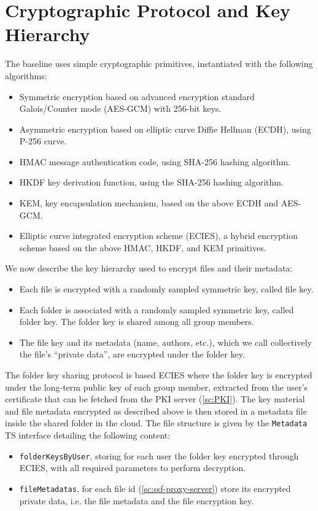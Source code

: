\section{Cryptographic Protocol and Key Hierarchy}\label{sc:baseline-protocol-hierarcy}

The baseline uses simple cryptographic primitives, instantiated with the following algorithms:
\begin{itemize}
    \item Symmetric encryption based on advanced encryption standard Galois/Counter mode (AES-GCM) with 256-bit keys.
    \item Asymmetric encryption based on elliptic curve Diffie Hellman (ECDH), using P-256 curve.
    \item HMAC message authentication code, using SHA-256 hashing algorithm. 
    \item HKDF key derivation function, using the SHA-256 hashing algorithm.
    \item KEM, key encapsulation mechanism, based on the above ECDH and AES-GCM.
    \item Elliptic curve integrated encryption scheme (ECIES), a hybrid encryption scheme based on the above HMAC, HKDF, and KEM primitives.
\end{itemize}

We now describe the key hierarchy used to encrypt files and their metadata:
\begin{itemize}
    \item Each file is encrypted with a randomly sampled symmetric key, called file key.
    \item Each folder is associated with a randomly sampled symmetric key, called folder key. The folder key is shared among all group members.
    \item The file key and its metadata (name, authors, etc.), which we call collectively the file's ``private data'', are encrypted under the folder key.
\end{itemize}

The folder key sharing protocol is based ECIES where the folder key
is encrypted under the long-term public key of each group member,
extracted from the user's certificate that can be fetched
from the PKI server (\cref{sc:PKI}).
The key material and file metadata encrypted as described above is
then stored in a metadata file inside the shared folder in the cloud.
The file structure is given by the \texttt{Metadata} TS interface
detailing the following content:
\begin{itemize}
    \item \texttt{folderKeysByUser}, storing for each user the folder key encrypted through ECIES, with all required parameters to perform decryption.
    \item \texttt{fileMetadatas}, for each file id (\cref{sc:ssf-proxy-server}) store its encrypted private data, i.e. the file metadata and the file encryption key.
\end{itemize}

